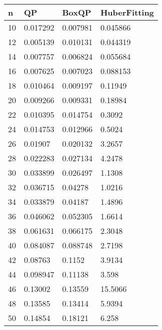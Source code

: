 \begin{tabular}{llll}
n & QP & BoxQP & HuberFitting \\ 
\hline 
10 & 0.017292 & 0.007981 & 0.045866 \\ 
12 & 0.005139 & 0.010131 & 0.044319 \\ 
14 & 0.007757 & 0.006824 & 0.055684 \\ 
16 & 0.007625 & 0.007023 & 0.088153 \\ 
18 & 0.010464 & 0.009197 & 0.11949 \\ 
20 & 0.009266 & 0.009331 & 0.18984 \\ 
22 & 0.010395 & 0.014754 & 0.3092 \\ 
24 & 0.014753 & 0.012966 & 0.5024 \\ 
26 & 0.01907 & 0.020132 & 3.2657 \\ 
28 & 0.022283 & 0.027134 & 4.2478 \\ 
30 & 0.033899 & 0.026497 & 1.1308 \\ 
32 & 0.036715 & 0.04278 & 1.0216 \\ 
34 & 0.033879 & 0.04187 & 1.4896 \\ 
36 & 0.046062 & 0.052305 & 1.6614 \\ 
38 & 0.061631 & 0.066175 & 2.3048 \\ 
40 & 0.084087 & 0.088748 & 2.7198 \\ 
42 & 0.08763 & 0.1152 & 3.9134 \\ 
44 & 0.098947 & 0.11138 & 3.598 \\ 
46 & 0.13002 & 0.13559 & 15.5066 \\ 
48 & 0.13585 & 0.13414 & 5.9394 \\ 
50 & 0.14854 & 0.18121 & 6.258 \\ 
\hline 
\end{tabular}